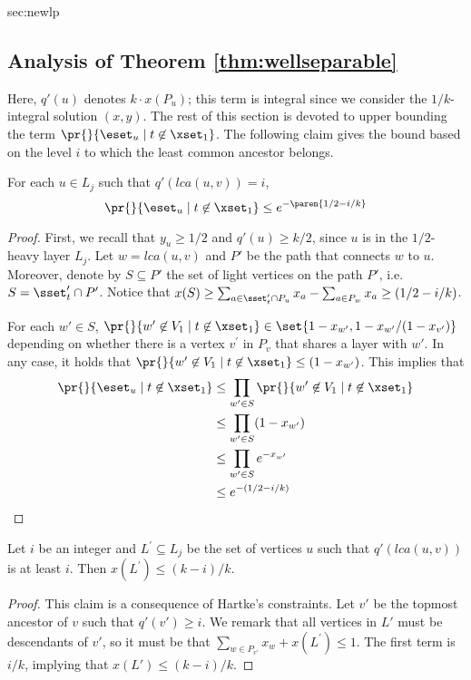 \begin{appendixextra}{sec:newlp}{\subsection{Analysis of Theorem \ref{thm:wellseparable}}}
Here, $q'(u)$ denotes $k \cdot x(P_u)$; this term is integral since we consider the $1/k$-integral solution $(x,y)$.  
The rest of this section is devoted to upper bounding the term $\pr{}{\eset_u \mid t \not \in \xset_1}$. 
The following claim gives the bound based on the level $i$ to which the least common ancestor belongs.

\begin{claim} 
\label{newlp:advantage:probpair}
For each $u \in L_j$ such that $q'(lca(u,v)) = i$, 
\[\pr{}{\eset_u \mid t \not \in \xset_1} \leq e^{-\paren{1/2 -i/k}}\]
\end{claim}

\begin{proof}
First, we recall that $y_u \geq 1/2$ and $q'(u) \geq k/2$, since $u$ is in the $1/2$-heavy layer $L_j$.  
Let $w= lca(u,v)$ and $P'$ be the path that connects $w$ to $u$.
Moreover, denote by $S \subseteq P'$ the set of light vertices on the path $P'$, i.e. $S = \sset'_t \cap P'$.   
Notice that $x(S) \geq \sum_{a \in \sset'_t \cap P_u} x_a - \sum_{a \in P_w} x_a  \geq (1/2 - i/k)$.  

For each $w' \in S$, $\pr{}{w' \not \in V_1 \mid t \not \in \xset_1} \in \set{1-x_{w^\prime}, 1- x_{w^\prime}/(1-x_{v^\prime})}$ depending on whether there is a vertex $v^\prime$ in $P_v$ that shares a layer with $w'$. 
In any case, it holds that $\pr{}{w' \not \in V_1 \mid t \not \in \xset_1} \leq (1-x_{w^\prime})$.
This implies that 
\begin{align*}
\pr{}{\eset_u \mid t \not \in \xset_1 } &\leq \prod_{w' \in S} \pr{}{w' \not \in V_1 \mid t \not \in \xset_1}  \\
&\leq \prod_{w' \in S} (1-x_{w^\prime}) \\
&\leq \prod_{w' \in S} e^{-x_{w^\prime}} \\
&\leq e^{-(1/2-i/k)} 
\end{align*}
\end{proof} 

\begin{claim} 
\label{newlp:advantage:nelems}
Let $i$ be an integer and $L^\prime \subseteq L_j$ be the set of vertices $u$ such that $q'(lca(u,v))$ is at least $i$. Then $x(L^\prime) \leq (k-i)/k$.
\end{claim} 

\begin{proof} 
This claim is a consequence of Hartke's constraints.
Let $v'$ be the topmost ancestor of $v$ such that $q'(v') \geq i$. 
We remark that all vertices in $L'$ must be descendants of $v'$, so it must be that $\sum_{w \in P_{v'}} x_w + x(L^\prime) \leq 1$. 
The first term is $i/k$, implying that $x(L') \leq (k-i)/k$.
\end{proof} 


\end{appendixextra}
